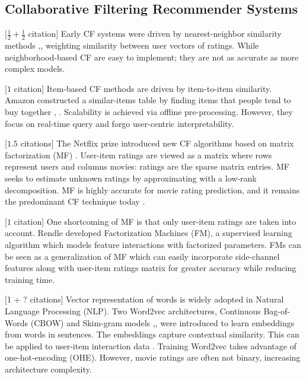 \subsection{Collaborative Filtering Recommender Systems}

[$ \frac{1}{2} + \frac{1}{2} $ citation] Early CF systems were driven by nearest-neighbor similarity methods \cite{herlocker1999algorithmic},\cite{smith2017two}, weighting similarity between user vectors of ratings. While neighborhood-based CF are easy to implement; they are not as accurate as more complex models.

[$1$ citation] Item-based CF methods are driven by item-to-item similarity. Amazon constructed a similar-items table by finding items that people tend to buy together \cite{linden2003amazon}, \cite{smith2017two}. Scalability is achieved via offline pre-processing. However, they focus on real-time query and forgo user-centric interpretability. 

[$1.5$ citations] The Netflix prize introduced new CF algorithms based on matrix factorization (MF) \cite{funk2006netflix}. User-item ratings are viewed as a matrix where rows represent users and columns movies: ratings are the sparse matrix entries. MF seeks to estimate unknown ratings by approximating with a low-rank decomposition. MF is highly accurate for movie rating prediction, and it remains the predominant CF technique today \cite{koren2008factorization}. 

[$1$ citation] One shortcoming of MF is that only user-item ratings are taken into account. Rendle \cite{rendle2012factorization} developed Factorization Machines (FM), a supervised learning algorithm which models feature interactions with factorized parameters.  FMs can be seen as a generalization of MF which can easily incorporate side-channel features along with user-item ratings matrix for greater accuracy while reducing training time.

[1 + ? citations] Vector representation of words is widely adopted in Natural Language Processing (NLP). Two Word2vec architectures, Continuous Bag-of-Words (CBOW) and Skim-gram models \cite{mikolov2013efficient},\cite{mikolov2013distributed}, \cite{rong2014word2vec} were introduced to learn embeddings from words in sentences. The embeddings capture contextual similarity. This can be applied to user-item interaction data \cite{ozsoy2016word}. Training Word2vec takes advantage of one-hot-encoding (OHE). However, movie ratings are often not binary, increasing architecture complexity.

